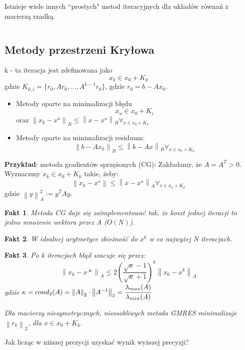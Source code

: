 \documentclass[hidelinks,a4paper,fleqn,oneside]{book}
\newcommand{\norm}[1]{\left\lVert#1\right\rVert}
\newtheorem{fakt}{Fakt}
\begin{document}
Istnieje wiele innych ``prostych" metod iteracyjnych dla układów równań z macierzą rzadką.

$\quad$ 

\subsection{Metody przestrzeni Kryłowa}
k - ta iteracja jest zdefinowana jako
\[
	x_k \in x_0 + K_k
\]
gdzie $K_{k, i} = \{r_0, Ar_0, ..., A^{k-1}r_0\}$, gdzie $r_0 = b - Ax_0$.

\begin{itemize}
	\item Metody oparte na minimalizacji błędu
	      \[
	      	x_u \in x_0 + K_i
	      \]
	      oraz $\norm{x_k - x^\star}_B \leq \norm{x - x^\star}_B \forall_{x \in x_0 + K_k}$ 
	\item Metody oparte na minimalizacji residuum:
	      \[
	      	\norm{b - Ax_k}_B \leq \norm{b - Ax}_B \forall_{x \in x_0 + K_k}
	      \]
\end{itemize}
	
\textbf{Przykład}: metoda gradientów sprzężonych (CG):
Zakładamy, że $A = A^T > 0$. Wyznaczmy $x_k \in x_0 + K_k$ takie, żeby:
\[
	\norm{x_k - x^\star} \leq \norm{x - x^\star}_A \forall_{x \in x_0 + K_k}
\]
gdzie $\norm{y}_A^2 := y^T A y$.	
	
\begin{fakt} Metoda CG daje się zaimplementować tak, że koszt jednej iteracji to jedno mnożenie wektora przez A ($O(N)$).
\end{fakt}	

\begin{fakt} W idealnej arytmetyce zbieżność do $x^k$ w co najwyżej N iteracjach.
\end{fakt}	

\begin{fakt} Po k iteracjach błąd szacuje się przez:
	\[
		\norm{x_k - x*} _A \leq 2 \left(\frac{\sqrt{\kappa} - 1}{\sqrt{\kappa} + 1}\right)^k \norm{x_0 - x^k}_A
	\]
	gdzie $\kappa = cond_2(A) = \norm{A} _2 \cdot \norm{A^{-1}}_2 = \cfrac{\lambda_{max}(A)}{\lambda_{min}(A)}$
	
	Dla macierzy niesymetrycznych, nieosobliwych metoda GMRES minimalizuje $\norm{r_k}_2$, dla $x \in x_0 + K_k$.
\end{fakt}

Jak licząc w niższej prezycji uzyskać wynik wyższej precyzji?
\end{document}
